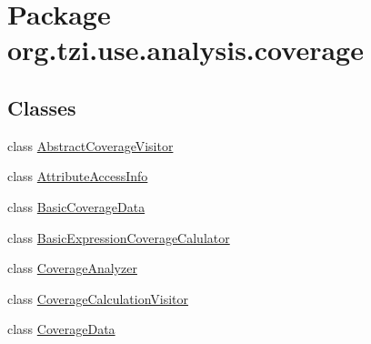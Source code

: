 \hypertarget{namespaceorg_1_1tzi_1_1use_1_1analysis_1_1coverage}{\section{Package org.\-tzi.\-use.\-analysis.\-coverage}
\label{namespaceorg_1_1tzi_1_1use_1_1analysis_1_1coverage}
}
\subsection*{Classes}
\begin{DoxyCompactItemize}
\item 
class \hyperlink{classorg_1_1tzi_1_1use_1_1analysis_1_1coverage_1_1_abstract_coverage_visitor}{Abstract\-Coverage\-Visitor}
\item 
class \hyperlink{classorg_1_1tzi_1_1use_1_1analysis_1_1coverage_1_1_attribute_access_info}{Attribute\-Access\-Info}
\item 
class \hyperlink{classorg_1_1tzi_1_1use_1_1analysis_1_1coverage_1_1_basic_coverage_data}{Basic\-Coverage\-Data}
\item 
class \hyperlink{classorg_1_1tzi_1_1use_1_1analysis_1_1coverage_1_1_basic_expression_coverage_calulator}{Basic\-Expression\-Coverage\-Calulator}
\item 
class \hyperlink{classorg_1_1tzi_1_1use_1_1analysis_1_1coverage_1_1_coverage_analyzer}{Coverage\-Analyzer}
\item 
class \hyperlink{classorg_1_1tzi_1_1use_1_1analysis_1_1coverage_1_1_coverage_calculation_visitor}{Coverage\-Calculation\-Visitor}
\item 
class \hyperlink{classorg_1_1tzi_1_1use_1_1analysis_1_1coverage_1_1_coverage_data}{Coverage\-Data}
\end{DoxyCompactItemize}
